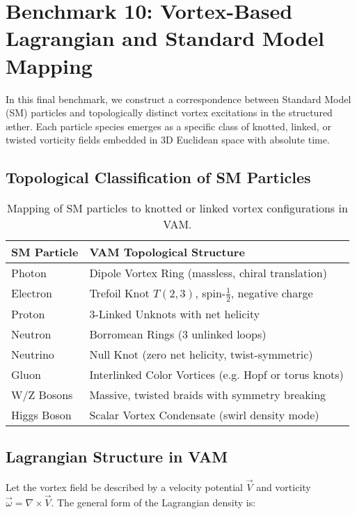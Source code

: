 \section{Benchmark 10: Vortex-Based Lagrangian and Standard Model Mapping}

In this final benchmark, we construct a correspondence between Standard Model (SM) particles and topologically distinct vortex excitations in the structured æther. Each particle species emerges as a specific class of knotted, linked, or twisted vorticity fields embedded in 3D Euclidean space with absolute time.

\subsection{Topological Classification of SM Particles}

\begin{table}[H]
\centering
\begin{tabular}{|l|l|}
\hline
\textbf{SM Particle} & \textbf{VAM Topological Structure} \\
\hline
Photon & Dipole Vortex Ring (massless, chiral translation) \\
Electron & Trefoil Knot \( T(2,3) \), spin-\( \frac{1}{2} \), negative charge \\
Proton & 3-Linked Unknots with net helicity \\
Neutron & Borromean Rings (3 unlinked loops) \\
Neutrino & Null Knot (zero net helicity, twist-symmetric) \\
Gluon & Interlinked Color Vortices (e.g. Hopf or torus knots) \\
W/Z Bosons & Massive, twisted braids with symmetry breaking \\
Higgs Boson & Scalar Vortex Condensate (swirl density mode) \\
\hline
\end{tabular}
\caption{Mapping of SM particles to knotted or linked vortex configurations in VAM.}
\end{table}

\subsection{Lagrangian Structure in VAM}

Let the vortex field be described by a velocity potential \( \vec{V} \) and vorticity \( \vec{\omega} = \nabla \times \vec{V} \). The general form of the Lagrangian density is:

